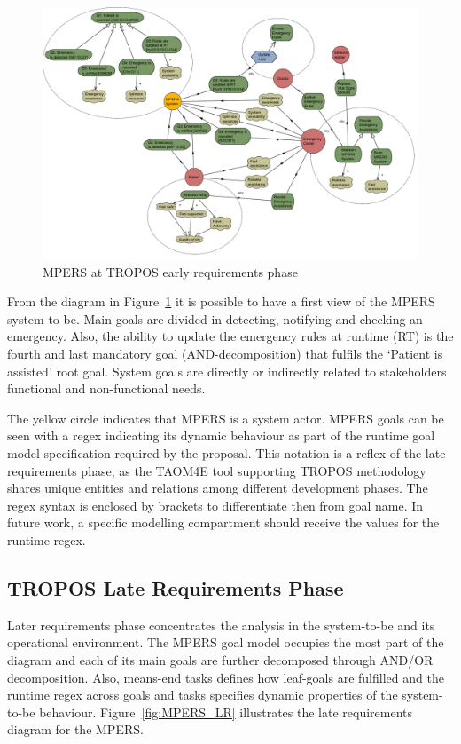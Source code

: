 \begin{figure}[ht]
\centering
\includegraphics[width=1\textwidth]{imgs/MPERS_ER.png}
\caption{MPERS at TROPOS early requirements phase}
\label{fig:MPERS_ER}
\end{figure}

From the diagram in Figure~\ref{fig:MPERS_ER} it is possible to have a first view of the MPERS system-to-be. Main goals are divided in detecting, notifying and checking an emergency. Also, the ability to update the emergency rules at runtime (RT) is the fourth and last mandatory goal (AND-decomposition) that fulfils the `Patient is assisted' root goal. System goals are directly or indirectly related to stakeholders functional and non-functional needs.

The yellow circle indicates that MPERS is a system actor. MPERS goals can be seen with a regex indicating its dynamic behaviour as part of the runtime goal model specification required by the proposal. This notation is a reflex of the late requirements phase, as the TAOM4E tool supporting TROPOS methodology shares unique entities and relations among different development phases. The regex syntax is enclosed by brackets to differentiate then from goal name. In future work, a specific modelling compartment should receive the values for the runtime regex.

\subsection{TROPOS Late Requirements Phase}

Later requirements phase concentrates the analysis in the system-to-be and its operational environment. The MPERS goal model occupies the most part of the diagram and each of its main goals are further decomposed through AND/OR decomposition. Also, means-end tasks defines how leaf-goals are fulfilled and the runtime regex across goals and tasks specifies dynamic properties of the system-to-be behaviour. Figure~\ref{fig:MPERS_LR} illustrates the late requirements diagram for the MPERS.


